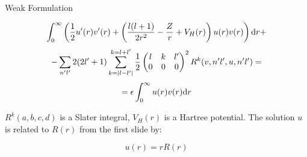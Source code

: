 \documentclass{beamer}
\def\d{{\rm d}}
\begin{document}
\begin{frame}{Weak Formulation}

\[
    \int_0^\infty \left( {1\over2} u'(r) v'(r) +
        \left({l(l+1)\over 2r^2} -{Z\over r} + V_H(r)\right)u(r)v(r)
            \right) \d r+
\]
\[
            -\sum_{n'l'}
                2(2l'+1)
                \sum_{k=|l-l'|}^{k=l+l'}
                {1\over2}\begin{pmatrix} l & k & l' \\ 0 & 0 & 0 \end{pmatrix}^2
                R^k(v, n'l', u, n'l')
        =
\]
\[
        = \epsilon \int_0^\infty u(r)v(r)\d r
\]

$R^k(a, b, c, d)$ is a Slater integral, $V_H(r)$ is a Hartree potential.
The solution $u$ is related to $R(r)$ from the first slide by:

\[
    u(r) = rR(r)
\]

\end{frame}
\end{document}

